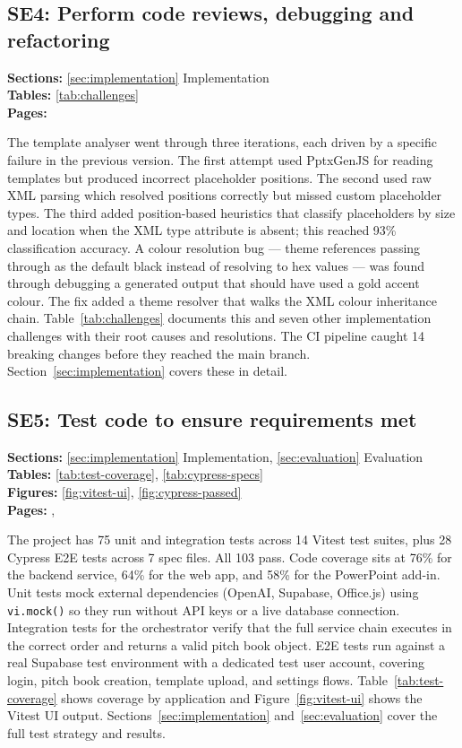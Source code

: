 \subsection*{SE4: Perform code reviews, debugging and refactoring}

\noindent\textbf{Sections:} \ref{sec:implementation} Implementation\\
\noindent\textbf{Tables:} \ref{tab:challenges}\\
\noindent\textbf{Pages:} \pageref{sec:implementation}

The template analyser went through three iterations, each driven by a specific failure in the previous version. The first attempt used PptxGenJS for reading templates but produced incorrect placeholder positions. The second used raw XML parsing which resolved positions correctly but missed custom placeholder types. The third added position-based heuristics that classify placeholders by size and location when the XML type attribute is absent; this reached 93\% classification accuracy. A colour resolution bug — theme references passing through as the default black instead of resolving to hex values — was found through debugging a generated output that should have used a gold accent colour. The fix added a theme resolver that walks the XML colour inheritance chain. Table~\ref{tab:challenges} documents this and seven other implementation challenges with their root causes and resolutions. The CI pipeline caught 14 breaking changes before they reached the main branch. Section~\ref{sec:implementation} covers these in detail.

\subsection*{SE5: Test code to ensure requirements met}

\noindent\textbf{Sections:} \ref{sec:implementation} Implementation, \ref{sec:evaluation} Evaluation\\
\noindent\textbf{Tables:} \ref{tab:test-coverage}, \ref{tab:cypress-specs}\\
\noindent\textbf{Figures:} \ref{fig:vitest-ui}, \ref{fig:cypress-passed}\\
\noindent\textbf{Pages:} \pageref{sec:implementation}, \pageref{sec:evaluation}

The project has 75 unit and integration tests across 14 Vitest test suites, plus 28 Cypress E2E tests across 7 spec files. All 103 pass. Code coverage sits at 76\% for the backend service, 64\% for the web app, and 58\% for the PowerPoint add-in. Unit tests mock external dependencies (OpenAI, Supabase, Office.js) using \texttt{vi.mock()} so they run without API keys or a live database connection. Integration tests for the orchestrator verify that the full service chain executes in the correct order and returns a valid pitch book object. E2E tests run against a real Supabase test environment with a dedicated test user account, covering login, pitch book creation, template upload, and settings flows. Table~\ref{tab:test-coverage} shows coverage by application and Figure~\ref{fig:vitest-ui} shows the Vitest UI output. Sections~\ref{sec:implementation} and~\ref{sec:evaluation} cover the full test strategy and results.

